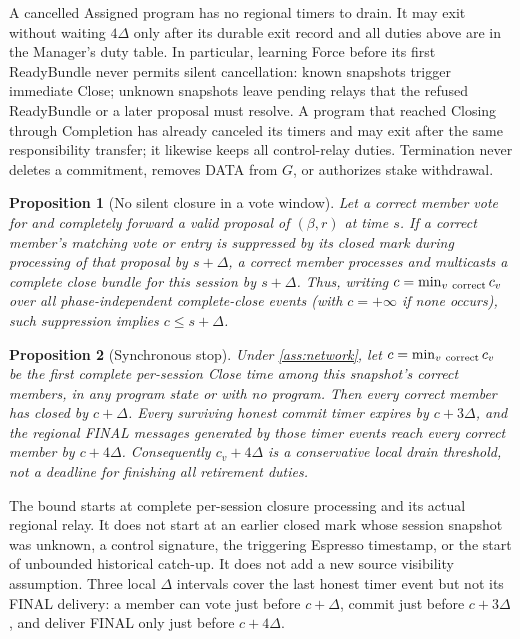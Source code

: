 \documentclass[11pt,a4paper]{article}
\newtheorem{proposition}[proposition]{Proposition}
\begin{document}
A cancelled Assigned program has no regional timers to drain. It may exit without waiting $4\Delta$ only after
its durable exit record and all duties above are in the Manager's
duty table. In particular, learning Force before its first ReadyBundle never
permits silent cancellation: known snapshots trigger immediate
Close; unknown snapshots leave pending relays that the refused
ReadyBundle or a later proposal must resolve. A program that reached
Closing through Completion has already canceled its timers and may exit
after the same responsibility transfer; it likewise keeps all
control-relay duties. Termination never deletes a commitment,
removes DATA from $G$, or authorizes stake withdrawal.


\begin{proposition}[No silent closure in a vote window]
\label{prop:retirement-observable-close}
Let a correct member vote for and completely forward a valid proposal
of $(\beta,r)$ at time $s$. If a correct member's matching vote or entry
is suppressed by its closed mark during processing of
that proposal by $s+\Delta$, a correct member processes and multicasts
a complete close bundle for this session by $s+\Delta$. Thus, writing
$c=\min_{v\ {\rm correct}}c_v$ over all phase-independent complete-close
events (with $c=+\infty$ if none occurs), such suppression implies
$c\le s+\Delta$.
\end{proposition}

\begin{proposition}[Synchronous stop]
\label{prop:retirement-drain}
Under \cref{ass:network}, let $c=\min_{v\ {\rm correct}}c_v$ be the first
complete per-session Close time among this snapshot's correct
members, in any program state or with no program. Then every correct member has closed by $c+\Delta$.
Every surviving honest commit timer expires by $c+3\Delta$, and the
regional FINAL messages generated by those timer events reach every
correct member by $c+4\Delta$. Consequently $c_v+4\Delta$ is a
conservative local drain threshold, not a deadline for finishing all
retirement duties.
\end{proposition}

The bound starts at complete per-session closure processing and its
actual regional relay. It does not start at an earlier closed mark
whose session snapshot was unknown, a control signature, the triggering Espresso timestamp, or the
start of unbounded historical catch-up. It does not add a new source
visibility assumption. Three local $\Delta$ intervals cover the last
honest timer event but not its FINAL delivery: a member can vote just
before $c+\Delta$, commit just before $c+3\Delta$, and deliver FINAL
only just before $c+4\Delta$.
\end{document}

